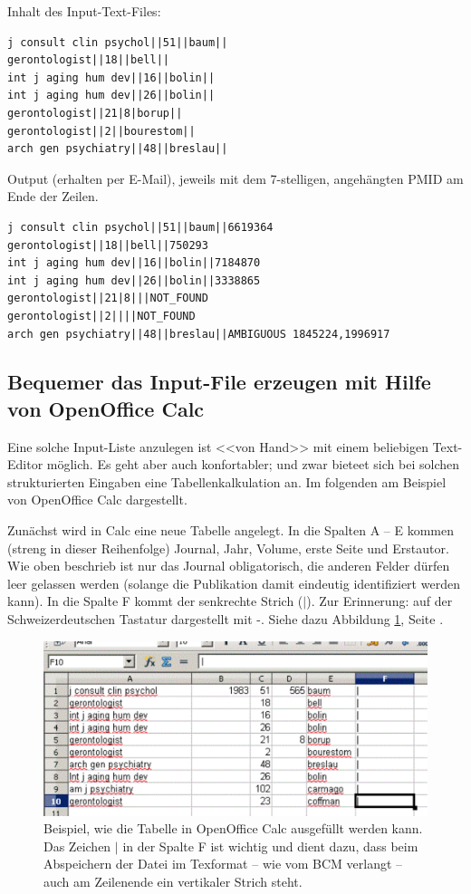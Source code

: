 \documentclass[div=15,parskip=half]{scrartcl}
\begin{document}
Inhalt des Input-Text-Files:
\begin{verbatim}
j consult clin psychol||51||baum||
gerontologist||18||bell||
int j aging hum dev||16||bolin||
int j aging hum dev||26||bolin||
gerontologist||21|8|borup||
gerontologist||2||bourestom||
arch gen psychiatry||48||breslau||
\end{verbatim}

Output (erhalten per E-Mail), jeweils mit dem 7-stelligen, angehängten PMID am Ende der Zeilen.

\begin{verbatim}
j consult clin psychol||51||baum||6619364
gerontologist||18||bell||750293
int j aging hum dev||16||bolin||7184870
int j aging hum dev||26||bolin||3338865
gerontologist||21|8|||NOT_FOUND
gerontologist||2||||NOT_FOUND
arch gen psychiatry||48||breslau||AMBIGUOUS 1845224,1996917
\end{verbatim}


\subsection*{Bequemer das Input-File erzeugen mit Hilfe von OpenOffice Calc}

Eine solche Input-Liste anzulegen ist <<von Hand>> mit einem beliebigen Text-Editor möglich. Es geht aber auch konfortabler; und zwar bieteet sich bei solchen strukturierten Eingaben eine Tabellenkalkulation an. Im folgenden am Beispiel von OpenOffice Calc dargestellt.

Zunächst wird in Calc eine neue Tabelle angelegt. In die Spalten A -- E kommen (streng in dieser Reihenfolge) Journal, Jahr, Volume, erste Seite und Erstautor. Wie oben beschrieb ist nur das Journal obligatorisch, die anderen Felder dürfen leer gelassen werden (solange die Publikation damit eindeutig identifiziert werden kann). In die Spalte F kommt der senkrechte Strich ($\vert$). Zur Erinnerung: auf der Schweizerdeutschen Tastatur dargestellt mit \AltGr-. Siehe dazu Abbildung \ref{fig:Tabelle}, Seite \pageref{fig:Tabelle}.

\begin{figure}
\label{fig:Tabelle}
\center
\includegraphics[scale=.7]{fig-oo-calc.pdf} 
\caption{Beispiel, wie die Tabelle in OpenOffice Calc ausgefüllt werden kann. Das Zeichen $\vert$ in der Spalte F ist wichtig und dient dazu, dass beim Abspeichern der Datei im Texformat -- wie vom BCM verlangt -- auch am Zeilenende ein vertikaler Strich steht.}
\end{figure}
\end{document}
